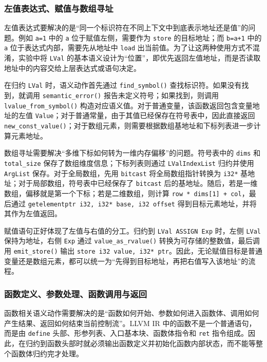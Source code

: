 \documentclass[12pt]{ctexart}
\begin{document}
\subsubsection{左值表达式、赋值与数组寻址}

左值表达式要解决的是“同一个标识符在不同上下文中到底表示地址还是值”的问题。例如 \texttt{a=1} 中的 \texttt{a} 位于赋值左侧，需要作为 \texttt{store} 的目标地址；而 \texttt{b=a+1} 中的 \texttt{a} 位于表达式内部，需要先从地址中 \texttt{load} 出当前值。为了让这两种使用方式不混淆，实验中将 \texttt{LVal} 的基本语义设计为“位置”，即优先返回左值地址，而是否读取地址中的内容交给上层表达式或语句决定。

在归约 \texttt{LVal} 时，语义动作首先通过 \texttt{find\_symbol()} 查找标识符。如果没有找到，就调用 \texttt{semantic\_error()} 报告未定义符号；如果找到，则调用 \texttt{lvalue\_from\_symbol()} 构造对应语义值。对于普通变量，该函数返回包含变量地址的左值 \texttt{Value}；对于普通常量，由于其值已经保存在符号表中，因此直接返回 \texttt{new\_const\_value()}；对于数组元素，则需要根据数组基地址和下标列表进一步计算元素地址。

数组寻址需要解决“多维下标如何转为一维内存偏移”的问题。符号表中的 \texttt{dims} 和 \texttt{total\_size} 保存了数组维度信息；下标列表则通过 \texttt{LValIndexList} 归约并使用 \texttt{ArgList} 保存。对于全局数组，先用 \texttt{bitcast} 将全局数组指针转换为 \texttt{i32*} 基地址；对于局部数组，符号表中已经保存了 \texttt{bitcast} 后的基地址。随后，若是一维数组，偏移就是第一个下标；若是二维数组，则计算 \texttt{row * dims[1] + col}，最后通过 \texttt{getelementptr i32, i32* base, i32 offset} 得到目标元素地址，并将其作为左值返回。

赋值语句正好体现了左值与右值的分工。归约到 \texttt{LVal ASSIGN Exp} 时，左侧 \texttt{LVal} 保持为地址，右侧 \texttt{Exp} 通过 \texttt{value\_as\_rvalue()} 转换为可存储的整数值，最后调用 \texttt{emit\_store()} 输出 \texttt{store i32 value, i32* ptr}。因此，无论赋值目标是普通变量还是数组元素，都可以统一为“先得到目标地址，再把右值写入该地址”的流程。

\subsubsection{函数定义、参数处理、函数调用与返回}

函数相关语义动作需要解决的是“函数如何开始、参数如何进入函数体、调用如何产生结果、返回如何结束当前控制流”。LLVM IR 中的函数不是一个普通语句，而是由 \texttt{define} 头部、形参列表、入口基本块、函数体指令和 \texttt{ret} 指令组成。因此，在归约到函数头部时就必须输出函数定义并初始化函数内部状态，而不能等整个函数体归约完才处理。
\end{document}
